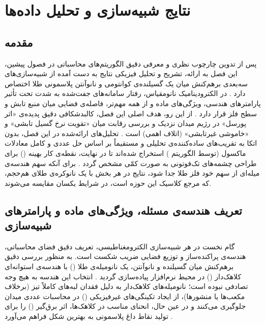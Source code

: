 \documentclass[12pt,a4paper]{report}
\begin{document}
\chapter{نتایج شبیه‌سازی و تحلیل داده‌ها}

\section{مقدمه}
پس از تدوین چارچوب نظری و معرفی دقیق الگوریتم‌های محاسباتی در فصول پیشین، این فصل به ارائه، تشریح و تحلیل فیزیکی نتایج به دست آمده از شبیه‌سازی‌های سه‌بعدی برهم‌کنش میان یک گسیلنده‌ی کوانتومی و نانوآنتن پلاسمونی طلا اختصاص دارد \cite{novotny,maier}. در الکترودینامیک نانومقیاس، رفتار سامانه‌های جفت‌شده به شدت تحت تأثیر پارامترهای هندسی، ویژگی‌های ماده و از همه مهم‌تر، فاصله‌ی فضایی میان منبع تابش و سطح فلز قرار دارد \cite{novotny,maier}. از این رو، هدف اصلی این فصل، کالبدشکافی دقیق پدیده‌ی «اثر پورسل» در رژیم میدان نزدیک و بررسی رقابت میان «تقویت نرخ گسیل تابشی» و «خاموشی غیرتابشی» (اتلاف اهمی) است \cite{novotny,anger}. تحلیل‌های ارائه‌شده در این فصل، بدون اتکا به تقریب‌های ساده‌کننده‌ی تحلیلی و مستقیماً بر اساس حل عددی و کامل معادلات ماکسول (توسط الگوریتم ) استخراج شده‌اند تا در نهایت، نقطه‌ی کار بهینه () برای طراحی چشمه‌های تک‌فوتونی به صورت کمّی مشخص گردد \cite{novotny,taflove}. برای آنکه سهم هندسه‌ی میله‌ای از سهم خود فلز طلا جدا شود، نتایج در هر بخش با یک نانوکره‌ی طلای هم‌حجم، که مرجع کلاسیک این حوزه است، در شرایط یکسان مقایسه می‌شوند.

\section{تعریف هندسه‌ی مسئله، ویژگی‌های ماده و پارامترهای شبیه‌سازی}
گام نخست در هر شبیه‌سازی الکترومغناطیسی، تعریف دقیق فضای محاسباتی، هندسه‌ی پراکنده‌ساز و توزیع فضایی ضریب شکست است. به منظور بررسی دقیق برهم‌کنش میان گسیلنده و نانوآنتن، یک نانومیله‌ی طلا () با هندسه‌ی استوانه‌ای کلاهک‌دار () در محیط نرم‌افزار پیاده‌سازی گردید \cite{maier,giannini}. انتخاب این هندسه به هیچ وجه تصادفی نبوده است؛ نانومیله‌های کلاهک‌دار به دلیل فقدان لبه‌های کاملاً تیز (برخلاف مکعب‌ها یا منشورها)، از ایجاد تکینگی‌های غیرفیزیکی () در محاسبات عددی میدان جلوگیری می‌کنند و در عین حال، انحنای مناسب در کلاهک‌ها، اثر برق‌گیر () را برای تولید نقاط داغ پلاسمونی به بهترین شکل فراهم می‌آورد \cite{novotny,bharadwaj}.
\end{document}
